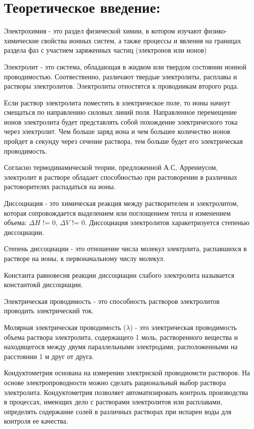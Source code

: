 \documentclass[a4paper,12pt]{article}
\begin{document}
\section*{Теоретическое введение:}

Электрохимия - это раздел физической химии, в котором изучают физико-химические свойства ионных систем, а также процессы и явления на границах раздела фаз с участием заряженных частиц (электронов или ионов)

Электролит - это система, обладающая в жидком или твердом состоянии ионной проводимостью. Соотвественно, различают твердые электролиты, расплавы и растворы электролитов. Электролиты отностятся к проводникам второго рода.

Если раствор электролита поместить в электрическое поле, то ионы начнут смещаться по направлению силовых линий поля. Направленное перемещение ионов электролита будет представлять собой похождение электрического тока через электролит. Чем больше заряд иона и чем большее количество ионов пройдет в секунду через сечение раствора, тем больше будет его электрическая проводимость.

Согласно термодинамической теории, предложенной А.С, Аррениусом, электролит в растворе обладает способностью при растоворении в различных растоворителях распадаться на ионы.

Диссоциация - это химическая реакция между растворителем и электролитом, которая сопровождается выделением или поглощением тепла и изменением объема: $\Delta{H}$ != 0, $\Delta{V}$ != 0. Диссоциация электролитов харакетризуется степенью диссоциации.

Степень диссоциации - это отношение числа молекул электрлита, распавшихся в растворе на ионы, к первоначальному числу молекул.

Константа равновесия реакции диссоциации слабого электролита называется константокй диссоциации.

Электрическая проводимость - это способность растворов электролитов проводить электрический ток.

Молярная электрическая проводимость ($\lambda$) - это электрическая проводимость объема раствора электролита, содержащего 1 моль, растворенного вещества и находящегося между двумя параллельными электродами, расположенными на расстоянии 1 м друг от друга.

Кондуктометрия основана на измерении электриской проводиомсти растворов. На основе электропроводности можно сделать рациональный выбор раствора электролита. Кондуктометрия позволяет автоматизировать контроль производства в процессах, имеющих дело с растворами электролитов или расплавами, определять содержание солей в различных растворах при испарен воды для контроля ее качества.
\end{document}
